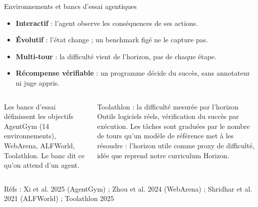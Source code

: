 \documentclass[aspectratio=169,10pt]{beamer}
\newcommand{\refs}[1]{\vfill{\tiny\textcolor{crMid}{Réfs : #1}}}
\begin{document}
\begin{frame}{Environnements et bancs d'essai agentiques}
\begin{itemize}
  \item \textbf{Interactif} : l'agent observe les conséquences de ses actions.
  \item \textbf{Évolutif} : l'état change ; un benchmark figé ne le capture pas.
  \item \textbf{Multi-tour} : la difficulté vient de l'horizon, pas de chaque étape.
  \item \textbf{Récompense vérifiable} : un programme décide du succès, sans annotateur ni juge appris.
\end{itemize}
\vspace{0.3cm}
\begin{columns}[T]
\begin{block}{Les bancs d'essai définissent les objectifs}
AgentGym (14 environnements), WebArena, ALFWorld, Toolathlon. Le banc dit ce qu'on attend d'un agent.
\end{block}
\begin{block}{Toolathlon : la difficulté mesurée par l'horizon}
Outils logiciels réels, vérification du succès par exécution. Les tâches sont graduées par le nombre de tours qu'un modèle de référence met à les résoudre : l'horizon utile comme proxy de difficulté, idée que reprend notre curriculum Horizon.
\end{block}
\end{columns}
\refs{Xi et al. 2025 (AgentGym) ; Zhou et al. 2024 (WebArena) ; Shridhar et al. 2021 (ALFWorld) ; Toolathlon 2025}
\end{frame}
\end{document}

